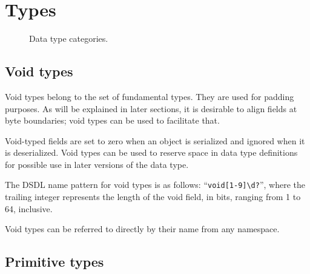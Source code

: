 \section{Types}

\begin{figure}[H]
    \centering
    \caption{Data type categories.\label{fig:dsdl_data_type_hierarchy}}
\end{figure}

\subsection{Void types}

Void types belong to the set of fundamental types.
They are used for padding purposes.
As will be explained in later sections, it is desirable to align fields at byte boundaries;
void types can be used to facilitate that.

Void-typed fields are set to zero when an object is serialized and ignored when it is deserialized.
Void types can be used to reserve space in data type definitions for possible use in later versions of the data type.

The DSDL name pattern for void types is as follows: ``\verb|void[1-9]\d?|'',
where the trailing integer represents the length of the void field, in bits,
ranging from 1 to 64, inclusive.

Void types can be referred to directly by their name from any namespace.

\subsection{Primitive types}

